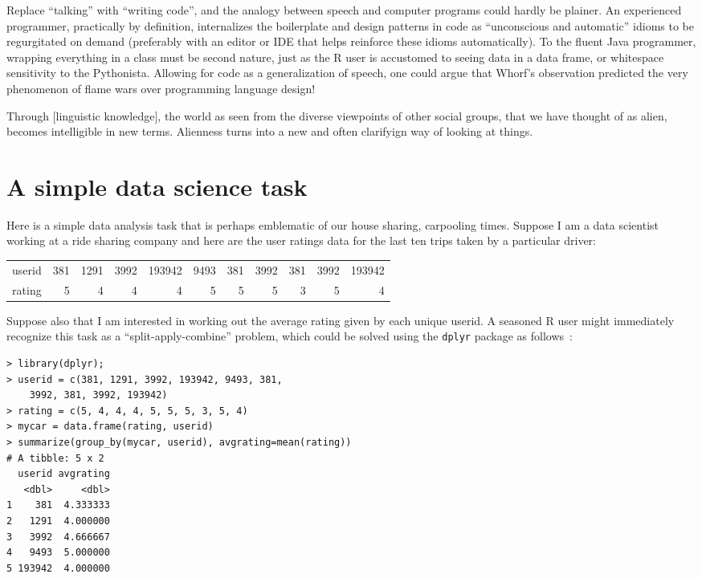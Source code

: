 \documentclass{article}
\begin{document}
Replace ``talking'' with ``writing code'', and the analogy between speech and
computer programs could hardly be plainer. An experienced programmer,
practically by definition, internalizes the boilerplate and design patterns in
code as ``unconscious and automatic'' idioms to be regurgitated on demand
(preferably with an editor or IDE that helps reinforce these idioms automatically).
To the fluent Java programmer, wrapping everything in a class must be second nature,
just as the R user is accustomed to seeing data in a data frame, or whitespace
sensitivity to the Pythonista.
Allowing for code as a generalization of speech, one could argue that Whorf's
observation predicted the very phenomenon of flame wars over programming language
design!


Through [linguistic knowledge], the world as seen from the diverse viewpoints of
other social groups, that we have thought of as alien, becomes intelligible in
new terms. Alienness turns into a new and often clarifyign way of looking at
things.~\cite{Whorf1956lmr}


\section{A simple data science task}

Here is a simple data analysis task that is perhaps emblematic of our house
sharing, carpooling times. Suppose I am a data scientist working at a ride
sharing company and here are the user ratings data for the last ten trips taken
by a particular driver:

\begin{tabular}{r|rrrrrrrrrr}
userid &
381    & 1291   & 3992   & 193942 & 9493   &
381    & 3992   & 381    & 3992   & 193942 \tabularnewline
rating &
5 & 4 & 4 & 4 & 5 & 5 & 5 & 3 & 5 & 4
\end{tabular}

Suppose also that I am interested in working out the average rating given
by each unique userid.
A seasoned R user might immediately recognize this task as a
``split-apply-combine'' problem, which could be solved using the \lstinline|dplyr|
package as follows~\cite{Wickham2011}:

\begin{lstlisting}
> library(dplyr);
> userid = c(381, 1291, 3992, 193942, 9493, 381,
    3992, 381, 3992, 193942)
> rating = c(5, 4, 4, 4, 5, 5, 5, 3, 5, 4)
> mycar = data.frame(rating, userid)
> summarize(group_by(mycar, userid), avgrating=mean(rating))
# A tibble: 5 x 2
  userid avgrating
   <dbl>     <dbl>
1    381  4.333333
2   1291  4.000000
3   3992  4.666667
4   9493  5.000000
5 193942  4.000000
\end{lstlisting}
\end{document}
